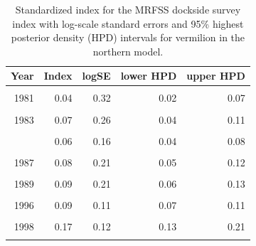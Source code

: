 \documentclass[11pt,
  english,
]{article}
\begin{document}
\begin{table}

\caption{\label{tab:tab-index-mrfss}Standardized index for the MRFSS dockside survey index with log-scale standard errors and 95\% highest
       posterior density (HPD) intervals for vermilion in the northern model.}
\centering
\begin{tabular}[t]{rrrrr}
\toprule
Year & Index & logSE & lower HPD & upper HPD\\
\midrule
\cellcolor{gray!6}{1980} & \cellcolor{gray!6}{0.05} & \cellcolor{gray!6}{0.21} & \cellcolor{gray!6}{0.03} & \cellcolor{gray!6}{0.08}\\
1981 & 0.04 & 0.32 & 0.02 & 0.07\\
\cellcolor{gray!6}{1982} & \cellcolor{gray!6}{0.05} & \cellcolor{gray!6}{0.23} & \cellcolor{gray!6}{0.03} & \cellcolor{gray!6}{0.07}\\
1983 & 0.07 & 0.26 & 0.04 & 0.11\\
\cellcolor{gray!6}{1984} & \cellcolor{gray!6}{0.09} & \cellcolor{gray!6}{0.20} & \cellcolor{gray!6}{0.06} & \cellcolor{gray!6}{0.13}\\
\addlinespace
1985 & 0.06 & 0.16 & 0.04 & 0.08\\
\cellcolor{gray!6}{1986} & \cellcolor{gray!6}{0.07} & \cellcolor{gray!6}{0.16} & \cellcolor{gray!6}{0.05} & \cellcolor{gray!6}{0.10}\\
1987 & 0.08 & 0.21 & 0.05 & 0.12\\
\cellcolor{gray!6}{1988} & \cellcolor{gray!6}{0.11} & \cellcolor{gray!6}{0.17} & \cellcolor{gray!6}{0.08} & \cellcolor{gray!6}{0.15}\\
1989 & 0.09 & 0.21 & 0.06 & 0.13\\
\addlinespace
\cellcolor{gray!6}{1995} & \cellcolor{gray!6}{0.08} & \cellcolor{gray!6}{0.20} & \cellcolor{gray!6}{0.05} & \cellcolor{gray!6}{0.12}\\
1996 & 0.09 & 0.11 & 0.07 & 0.11\\
\cellcolor{gray!6}{1997} & \cellcolor{gray!6}{0.23} & \cellcolor{gray!6}{0.11} & \cellcolor{gray!6}{0.19} & \cellcolor{gray!6}{0.29}\\
1998 & 0.17 & 0.12 & 0.13 & 0.21\\
\cellcolor{gray!6}{1999} & \cellcolor{gray!6}{0.09} & \cellcolor{gray!6}{0.12} & \cellcolor{gray!6}{0.07} & \cellcolor{gray!6}{0.11}\\
\bottomrule
\end{tabular}
\end{table}
\end{document}
